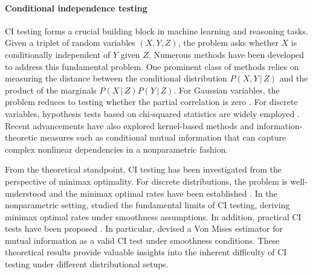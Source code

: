 \documentclass{article}
\theoremstyle{definition}
\theoremstyle{definition}
\theoremstyle{definition}
\theoremstyle{definition}
\theoremstyle{definition}
\theoremstyle{definition}
\theoremstyle{remark}
\theoremstyle{remark}
\newcommand{\given}{\,|\,}
\begin{document}
\paragraph{Conditional independence testing}
CI testing forms a crucial building block in machine learning and reasoning tasks. Given a triplet of random variables $(X,Y,Z)$, the problem asks whether $X$ is conditionally independent of $Y$ given $Z$. Numerous methods \citep[e.g.][]{dawid1979conditional, fukumizu2007kernel, ramsey2014scalable, li2020nonparametric} have been developed to address this fundamental problem. 
One prominent class of methods relies on measuring the distance between the conditional distribution $P(X, Y \given Z)$ and the product of the marginals $P(X \given Z)P(Y \given Z)$. 
For Gaussian variables, the problem reduces to testing whether the partial correlation is zero \citep{fisher1915frequency}.
For discrete variables, hypothesis tests based on chi-squared statistics are widely employed \cite{ireland1968contingency,darroch1980markov}. 
Recent advancements have also explored kernel-based methods \cite{gretton2007kernel,zhang2011kernel} and information-theoretic measures such as conditional mutual information \citep{runge2018conditional,berrett2019nonparametric} that can capture complex nonlinear dependencies in a nonparametric fashion.

From the theoretical standpoint, CI testing has been investigated from the perspective of minimax optimality. For discrete distributions, the problem is well-understood and the minimax optimal rates have been established  \citep{chan2014optimal,diakonikolas2016new,canonne2018testing}.
In the nonparametric setting, \citet{neykov2021minimax} studied the fundamental limits of CI testing, deriving minimax optimal rates under smoothness assumptions. In addition, practical CI tests have been proposed \citep{kim2022local,kim2024conditional}.
In particular, \citet{jamshidi2024on} devised a Von Mises estimator for mutual information as a valid CI test under smoothness conditions.
These theoretical results provide valuable insights into the inherent difficulty of CI testing under different distributional setups.
\end{document}
